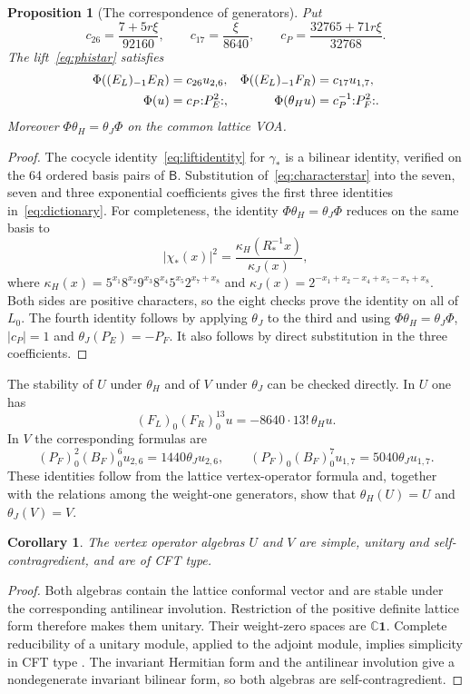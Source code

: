 \documentclass[11pt,reqno]{amsart}
\newtheorem{proposition}[theorem]{Proposition}
\newtheorem{corollary}[theorem]{Corollary}
\theoremstyle{definition}\newtheorem{definition}[theorem]{Definition}
\theoremstyle{remark}\newtheorem{remark}[theorem]{Remark}
\newcommand{\C}{\mathbb C}\newcommand{\Z}{\mathbb Z}\newcommand{\Q}{\mathbb Q}
\newcommand{\one}{\mathbf1}\newcommand{\slc}{\mathfrak{sl}_2}
\newcommand{\nn}[1]{\mathopen{:}#1\mathclose{:}}
\numberwithin{equation}{section}
\begin{document}
\begin{proposition}[The correspondence of generators]\label{prop:dictionary}
Put
\[
 c_{26}=\frac{7+5r\xi }{92160},\qquad c_{17}=\frac{\xi }{8640},\qquad
 c_P=\frac{32765+71r\xi }{32768}.
\]
The lift~\eqref{eq:phistar} satisfies
\begin{align}\label{eq:dictionary}
 \Phi((E_L)_{-1}E_R)&=c_{26}u_{2,6},&
 \Phi((E_L)_{-1}F_R)&=c_{17}u_{1,7},\notag\\
 \Phi(u)&=c_P\nn{P_E^2},&
 \Phi(\theta_Hu)&=c_P^{-1}\nn{P_F^2}.
\end{align}
Moreover $\Phi\theta_H=\theta_J\Phi$ on the common lattice VOA.
\end{proposition}
\begin{proof}
The cocycle identity~\eqref{eq:liftidentity} for $\gamma_*$ is a bilinear identity, verified on the 64 ordered basis pairs of $\mathsf B$. Substitution of~\eqref{eq:characterstar} into the seven, seven and three exponential coefficients gives the first three identities in~\eqref{eq:dictionary}. For completeness, the identity $\Phi\theta_H=\theta_J\Phi$ reduces on the same basis to
\[
 |\chi_*(x)|^2=\frac{\kappa_H(R_*^{-1}x)}{\kappa_J(x)},
\]
where $\kappa_H(x)=5^{x_1}8^{x_2}9^{x_3}8^{x_4}5^{x_5}2^{x_7+x_8}$ and
$\kappa_J(x)=2^{-x_1+x_2-x_4+x_5-x_7+x_8}$. Both sides are positive characters, so the eight checks prove the identity on all of $L_0$. The fourth identity follows by applying $\theta_J$ to the third and using $\Phi\theta_H=\theta_J\Phi$, $|c_P|=1$ and $\theta_J(P_E)=-P_F$. It also follows by direct substitution in the three coefficients.
\end{proof}

The stability of $U$ under $\theta_H$ and of $V$ under $\theta_J$ can be checked directly. In $U$ one has
\begin{equation}\label{eq:huangpct}
 (F_L)_{0}(F_R)_{0}^{13}u=-8640\cdot13!\,\theta_Hu.
\end{equation}
In $V$ the corresponding formulas are
\[
 (P_F)_{0}^2(B_F)_{0}^6u_{2,6}=1440\theta_Ju_{2,6},\qquad
 (P_F)_{0}(B_F)_{0}^7u_{1,7}=5040\theta_Ju_{1,7}.
\]
These identities follow from the lattice vertex-operator formula and, together with the relations among the weight-one generators, show that $\theta_H(U)=U$ and $\theta_J(V)=V$.

\begin{corollary}\label{cor:unitary}
The vertex operator algebras $U$ and $V$ are simple, unitary and self-contragredient, and are of CFT type.
\end{corollary}
\begin{proof}
Both algebras contain the lattice conformal vector and are stable under the corresponding antilinear involution. Restriction of the positive definite lattice form therefore makes them unitary. Their weight-zero spaces are $\C\one$. Complete reducibility of a unitary module, applied to the adjoint module, implies simplicity in CFT type \cite{DLUnitary}. The invariant Hermitian form and the antilinear involution give a nondegenerate invariant bilinear form, so both algebras are self-contragredient.
\end{proof}
\end{document}
